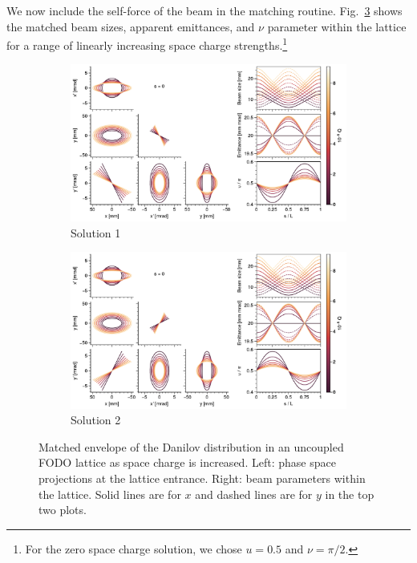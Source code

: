 We now include the self-force of the beam in the matching routine. Fig.~\ref{fig:matched_vs_sc_fodo} shows the matched beam sizes, apparent emittances, and $\nu$ parameter within the lattice for a range of linearly increasing space charge strengths.\footnote{For the zero space charge solution, we chose $u = 0.5$ and $\nu = \pi/2$.}
%
\begin{figure}[!p]
    \begin{subfigure}{1.0\textwidth}
        \includegraphics[width=\textwidth]{Images/chapter2/matched_vs_sc_fodo_mode1.pdf}
        \caption{Solution 1}
        \label{fig:matched_vs_sc_fodo_a}
    \end{subfigure}
    \vfill
    \vfill
    \begin{subfigure}{1.0\textwidth}
        \centering
        \includegraphics[width=\textwidth]{Images/chapter2/matched_vs_sc_fodo_mode2.pdf}
        \caption{Solution 2}
        \label{fig:matched_vs_sc_fodo_b}
    \end{subfigure}
    \caption{Matched envelope of the Danilov distribution in an uncoupled FODO lattice as space charge is increased. Left: phase space projections at the lattice entrance. Right: beam parameters within the lattice. Solid lines are for $x$ and dashed lines are for $y$ in the top two plots.}
    \label{fig:matched_vs_sc_fodo}
\end{figure}
